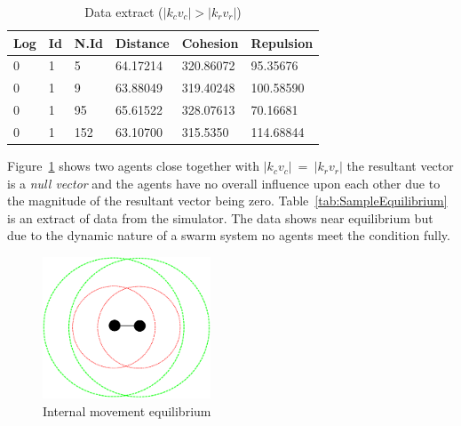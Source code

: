 \documentclass{ieeeaccess}
\begin{document}
\begin{table}[H]
\begin{center}
\begin{tabular}{| l | l | l | l | l | l |}
\hline
Log &	Id &	N.Id &	Distance &	{\color{green}Cohesion} & {\color{red}Repulsion} 	\\ \hline
0 & 1 & 5 &	64.17214 &	{\color{green}320.86072} &	{\color{red}95.35676} \\ \hline
0 & 1 & 9 &	63.88049 &	{\color{green}319.40248} &	{\color{red}100.58590} \\ \hline
0 & 1 & 95 & 65.61522 &	{\color{green}328.07613} &	{\color{red}70.16681} \\ \hline
0 & 1 & 152 & 63.10700 & {\color{green}315.5350} & {\color{red}114.68844} \\ 
\hline
\end{tabular}\caption{Data extract ($|k_cv_c| > |k_rv_r|$)} \label{tab:SampleCohesionPositive}
\end{center}
\end{table}

Figure~\ref{methods:Stability4} shows two agents close together with $|k_cv_c|~=~|k_rv_r|$ the resultant vector is a \emph{null vector} and the agents have no overall influence upon each other due to the magnitude of the resultant vector being zero. Table~\ref{tab:SampleEquilibrium} is an extract of data from the simulator. The data shows near equilibrium but due to the dynamic nature of a swarm system no agents meet the condition fully. 

\begin{figure}[H]
\begin{center}
\includegraphics[width=5cm]{figures/Stability4}
\end{center}
\caption{Internal movement equilibrium} \label{methods:Stability4}
\end{figure}
\end{document}
